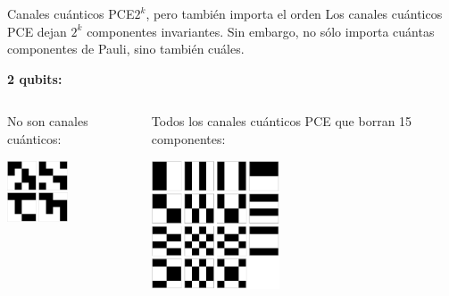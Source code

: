 \documentclass[xcolor=dvipsnames,presentation]{beamer}%
\begin{document}
\begin{frame}{Canales cuánticos PCE}{$2^k$, pero también importa el orden}
Los canales cuánticos PCE dejan $2^k$ componentes
invariantes. Sin embargo, no sólo importa cuántas 
componentes de Pauli, sino también cuáles. 

\vfill

\textbf{2 qubits:} \pause
\begin{columns}
\begin{column}{0.5\textwidth}
No son canales cuánticos:
\vspace{.3cm}
\begin{center}
\includegraphics[height=1.8cm]{images/2qubit-pce-BadoneHalf}
\end{center}
\vspace{1.6cm}
\end{column} \pause
\begin{column}{0.5\textwidth}
Todos los canales cuánticos PCE que borran 15 componentes:
\begin{center}
\includegraphics[height=3.8cm]{images/2qubit-pce-oneHalf}
\end{center}
\end{column}
\end{columns}
\end{frame}
\end{document}
